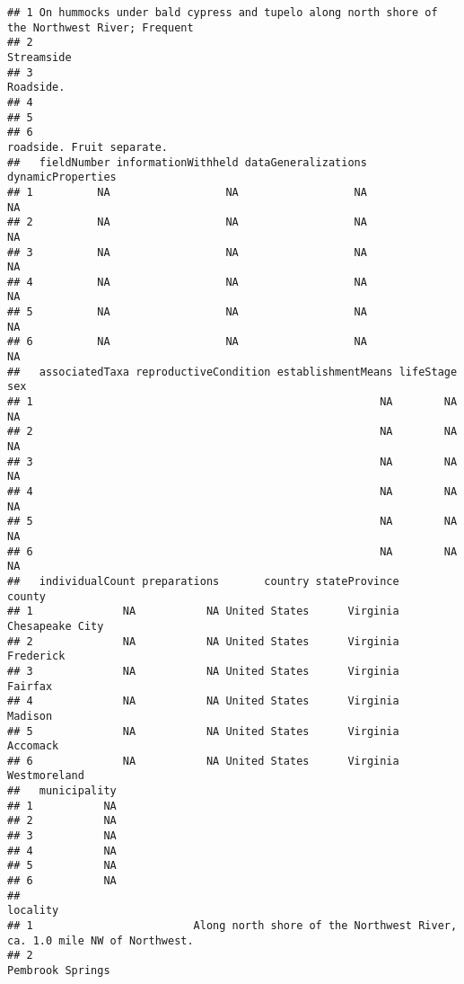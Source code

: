 \documentclass[
]{article}
\begin{document}
\begin{verbatim}
## 1 On hummocks under bald cypress and tupelo along north shore of the Northwest River; Frequent
## 2                                                                                   Streamside
## 3                                                                                    Roadside.
## 4                                                                                             
## 5                                                                                             
## 6                                                                    roadside. Fruit separate.
##   fieldNumber informationWithheld dataGeneralizations dynamicProperties
## 1          NA                  NA                  NA                NA
## 2          NA                  NA                  NA                NA
## 3          NA                  NA                  NA                NA
## 4          NA                  NA                  NA                NA
## 5          NA                  NA                  NA                NA
## 6          NA                  NA                  NA                NA
##   associatedTaxa reproductiveCondition establishmentMeans lifeStage sex
## 1                                                      NA        NA  NA
## 2                                                      NA        NA  NA
## 3                                                      NA        NA  NA
## 4                                                      NA        NA  NA
## 5                                                      NA        NA  NA
## 6                                                      NA        NA  NA
##   individualCount preparations       country stateProvince          county
## 1              NA           NA United States      Virginia Chesapeake City
## 2              NA           NA United States      Virginia       Frederick
## 3              NA           NA United States      Virginia         Fairfax
## 4              NA           NA United States      Virginia         Madison
## 5              NA           NA United States      Virginia        Accomack
## 6              NA           NA United States      Virginia    Westmoreland
##   municipality
## 1           NA
## 2           NA
## 3           NA
## 4           NA
## 5           NA
## 6           NA
##                                                                                          locality
## 1                         Along north shore of the Northwest River, ca. 1.0 mile NW of Northwest.
## 2                                                                                Pembrook Springs

\end{verbatim}
\end{document}
